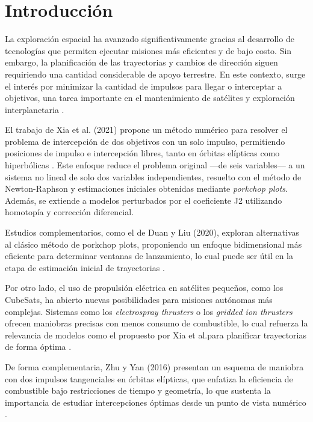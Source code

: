 \section{Introducción}

La exploración espacial ha avanzado significativamente gracias al desarrollo de tecnologías
que permiten ejecutar misiones más eficientes y de bajo costo. Sin embargo, la planificación de las trayectorias
y cambios de dirección siguen requiriendo una cantidad considerable de apoyo terrestre. En este contexto, surge el interés
por minimizar la cantidad de impulsos para llegar o interceptar a objetivos, una tarea importante en el mantenimiento de satélites
y exploración interplanetaria \parencite{ZHU20162177}.

El trabajo de Xia et al. (2021) propone un método numérico para resolver el problema de intercepción de dos objetivos
con un solo impulso, permitiendo posiciones de impulso e intercepción libres, tanto en órbitas elípticas como hiperbólicas \parencite{xia2021}.
Este enfoque reduce el problema original —de seis variables— a un sistema no lineal de solo dos variables independientes,
resuelto con el método de Newton-Raphson y estimaciones iniciales obtenidas mediante \textit{porkchop plots}.
Además, se extiende a modelos perturbados por el coeficiente J2 utilizando homotopía y corrección diferencial.

Estudios complementarios, como el de Duan y Liu (2020), exploran alternativas al clásico método de porkchop plots,
proponiendo un enfoque bidimensional más eficiente para determinar ventanas de lanzamiento, lo cual puede ser útil
en la etapa de estimación inicial de trayectorias \parencite{DUAN2020965}.

Por otro lado, el uso de propulsión eléctrica en satélites pequeños, como los CubeSats, ha abierto nuevas posibilidades para
misiones autónomas más complejas. Sistemas como los \textit{electrospray thrusters} o los \textit{gridded ion thrusters} ofrecen maniobras
precisas con menos consumo de combustible, lo cual refuerza la relevancia de modelos como el propuesto por Xia et al.\@ para planificar
trayectorias de forma óptima \parencite{oreilly2021}.

De forma complementaria, Zhu y Yan (2016) presentan un esquema de maniobra con dos impulsos tangenciales
en órbitas elípticas, que enfatiza la eficiencia de combustible bajo restricciones de tiempo y geometría, lo que sustenta
la importancia de estudiar intercepciones óptimas desde un punto de vista numérico \parencite{ZHU20162177}.